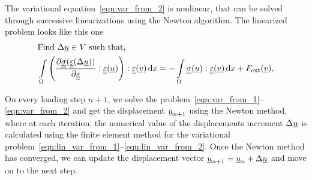 \documentclass[12pt]{article}
\newcommand{\todounderline}[1]{\todo[inline, size=\scriptsize]{#1}}
\begin{document}
The variational equation~\eqref{eqn:var_from_2} is nonlinear, that can be solved through successive linearizations using the
Newton algorithm. The linearized problem looks like this one
\begin{align}
    & \text{Find } \Delta\underline{u} \in V \text{ such that,} \label{eqn:lin_var_from_1} \\ 
    & \int\limits_\Omega \left(\frac{\partial\underline{\underline{\sigma}}(\underline{\underline{\varepsilon}}(\Delta\underline{u}))}{\partial\underline{\underline{\varepsilon}}} : \underline{\underline{\varepsilon}}(\underline{u})\right) : \underline{\underline{\varepsilon}}(\underline{v}) \, \mathrm{d} x = -\int\limits_\Omega\underline{\underline{\sigma}}(\underline{u}) : \underline{\underline{\varepsilon}}(\underline{v}) \, \mathrm{d} x + F_\text{ext}(\underline{v}) \label{eqn:lin_var_from_2},
\end{align}

On every loading step $n+1$, we solve the problem~\eqref{eqn:var_from_1}--\eqref{eqn:var_from_2} and get the displacement $\underline{u}_{n+1}$ using the Newton method, where at each iteration, the numerical value of the displacements increment $\Delta\underline{u}$ is calculated using the finite element method for the variational problem~\eqref{eqn:lin_var_from_1}--\eqref{eqn:lin_var_from_2}. Once the Newton method has converged, we can update the displacement vector $\underline{u}_{n+1} = \underline{u}_n + \Delta\underline{u}$ and move on to the next step. 
\end{document}
